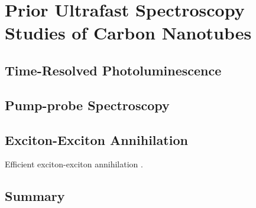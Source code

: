 \chapter{Prior Ultrafast Spectroscopy Studies of Carbon Nanotubes}



\section{Time-Resolved Photoluminescence}

\section{Pump-probe Spectroscopy}

\section{Exciton-Exciton Annihilation}
Efficient exciton-exciton annihilation \cite{murakami2009existence}.

\section{Summary}